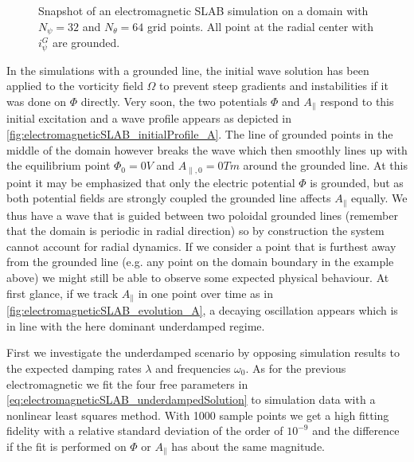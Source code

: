 \begin{figure}[H]
\begin{subfigure}[b]{0.45\textwidth}
		\label{fig:electromagneticSLAB_evolution_A}
	\end{subfigure}
	\caption{Snapshot of an electromagnetic SLAB simulation on a domain with $N_\psi=32$ and $N_\theta=64$ grid points. All point at the radial center with $i_\psi^G$ are grounded.}
	\label{fig:electromagneticGroundedSLAB_system}
\end{figure}

In the simulations with a grounded line, the initial wave solution has been applied to the vorticity field $\Omega$ to prevent steep gradients and instabilities if it was done on $\Phi$ directly. Very soon, the two potentials $\Phi$ and $A_\parallel$ respond to this initial excitation and a wave profile appears as depicted in \autoref{fig:electromagneticSLAB_initialProfile_A}. The line of grounded points in the middle of the domain however breaks the wave which then smoothly lines up with the equilibrium point $\Phi_0 = 0V$ and $A_{\parallel,0} = 0Tm$ around the grounded line. At this point it may be emphasized that only the electric potential $\Phi$ is grounded, but as both potential fields are strongly coupled the grounded line affects $A_\parallel$ equally. We thus have a wave that is guided between two poloidal grounded lines (remember that the domain is periodic in radial direction) so by construction the system cannot account for radial dynamics. If we consider a point that is furthest away from the grounded line (e.g. any point on the domain boundary in the example above) we might still be able to observe some expected physical behaviour. At first glance, if we track $A_\parallel$ in one point over time as in \autoref{fig:electromagneticSLAB_evolution_A}, a decaying oscillation appears which is in line with the here dominant underdamped regime. 	

First we investigate the underdamped scenario by opposing simulation results to the expected damping rates $\lambda$ and frequencies $\omega_0$. As for the previous electromagnetic we fit the four free parameters in \autoref{eq:electromagneticSLAB_underdampedSolution} to simulation data with a nonlinear least squares method. With 1000 sample points we get a high fitting fidelity with a relative standard deviation of the order of $10^{-9}$ and the difference if the fit is performed on $\Phi$ or $A_\parallel$ has about the same magnitude. 

